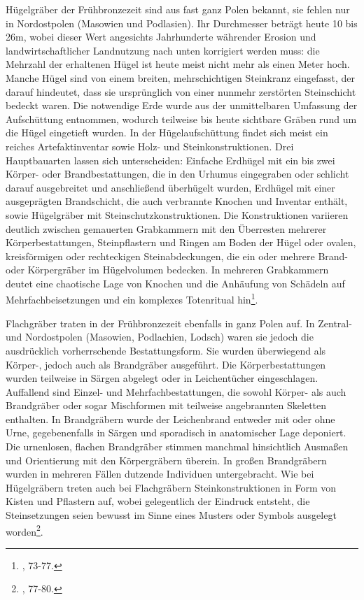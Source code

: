 \documentclass[openany,twoside,twocolumn]{book}
\let\rmarkdownfootnote\footnote%
\def\footnote{\protect\rmarkdownfootnote}
\begin{document}
Hügelgräber der Frühbronzezeit sind aus fast ganz Polen bekannt, sie fehlen nur in Nordostpolen (Masowien und Podlasien). Ihr Durchmesser beträgt heute 10 bis 26m, wobei dieser Wert angesichts Jahrhunderte währender Erosion und landwirtschaftlicher Landnutzung nach unten korrigiert werden muss: die Mehrzahl der erhaltenen Hügel ist heute meist nicht mehr als einen Meter hoch. Manche Hügel sind von einem breiten, mehrschichtigen Steinkranz eingefasst, der darauf hindeutet, dass sie ursprünglich von einer nunmehr zerstörten Steinschicht bedeckt waren. Die notwendige Erde wurde aus der unmittelbaren Umfassung der Aufschüttung entnommen, wodurch teilweise bis heute sichtbare Gräben rund um die Hügel eingetieft wurden. In der Hügelaufschüttung findet sich meist ein reiches Artefaktinventar sowie Holz- und Steinkonstruktionen. Drei Hauptbauarten lassen sich unterscheiden: Einfache Erdhügel mit ein bis zwei Körper- oder Brandbestattungen, die in den Urhumus eingegraben oder schlicht darauf ausgebreitet und anschließend überhügelt wurden, Erdhügel mit einer ausgeprägten Brandschicht, die auch verbrannte Knochen und Inventar enthält, sowie Hügelgräber mit Steinschutzkonstruktionen. Die Konstruktionen variieren deutlich zwischen gemauerten Grabkammern mit den Überresten mehrerer Körperbestattungen, Steinpflastern und Ringen am Boden der Hügel oder ovalen, kreisförmigen oder rechteckigen Steinabdeckungen, die ein oder mehrere Brand- oder Körpergräber im Hügelvolumen bedecken. In mehreren Grabkammern deutet eine chaotische Lage von Knochen und die Anhäufung von Schädeln auf Mehrfachbeisetzungen und ein komplexes Totenritual hin\footnote{\textcite{dabrowski_aeltere_2004}, 73-77.}.

Flachgräber traten in der Frühbronzezeit ebenfalls in ganz Polen auf. In Zentral- und Nordostpolen (Masowien, Podlachien, Lodsch) waren sie jedoch die ausdrücklich vorherrschende Bestattungsform. Sie wurden überwiegend als Körper-, jedoch auch als Brandgräber ausgeführt. Die Körperbestattungen wurden teilweise in Särgen abgelegt oder in Leichentücher eingeschlagen. Auffallend sind Einzel- und Mehrfachbestattungen, die sowohl Körper- als auch Brandgräber oder sogar Mischformen mit teilweise angebrannten Skeletten enthalten. In Brandgräbern wurde der Leichenbrand entweder mit oder ohne Urne, gegebenenfalls in Särgen und sporadisch in anatomischer Lage deponiert. Die urnenlosen, flachen Brandgräber stimmen manchmal hinsichtlich Ausmaßen und Orientierung mit den Körpergräbern überein. In großen Brandgräbern wurden in mehreren Fällen dutzende Individuen untergebracht. Wie bei Hügelgräbern treten auch bei Flachgräbern Steinkonstruktionen in Form von Kisten und Pflastern auf, wobei gelegentlich der Eindruck entsteht, die Steinsetzungen seien bewusst im Sinne eines Musters oder Symbols ausgelegt worden\footnote{\textcite{dabrowski_aeltere_2004}, 77-80.}.
\end{document}
